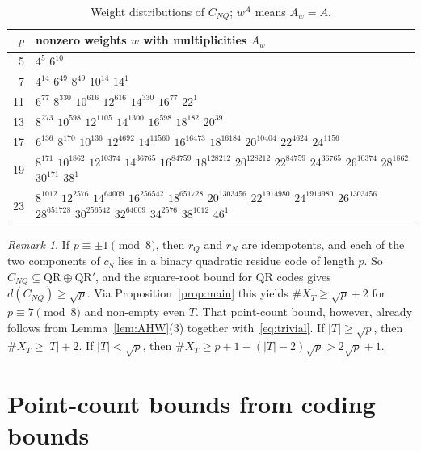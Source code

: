 \documentclass[12pt,letterpaper]{article}
\theoremstyle{definition}
\theoremstyle{remark}
\newtheorem{remark}[theorem]{Remark}
\numberwithin{equation}{section}
\newcommand{\CNQ}{C_{NQ}}
\newcommand{\X}{\#X}
\begin{document}
\begin{table}[ht]
\centering\small
\begin{tabular}{@{}r>{\raggedright\arraybackslash}p{}@{}}
\toprule
$p$ & nonzero weights $w$ with multiplicities $A_w$\\
\midrule
5 & $4^{5}$ $6^{10}$\\
7 & $4^{14}$ $6^{49}$ $8^{49}$ $10^{14}$ $14^{1}$\\
11 & $6^{77}$ $8^{330}$ $10^{616}$ $12^{616}$ $14^{330}$ $16^{77}$ $22^{1}$\\
13 & $8^{273}$ $10^{598}$ $12^{1105}$ $14^{1300}$ $16^{598}$ $18^{182}$ $20^{39}$\\
17 & $6^{136}$ $8^{170}$ $10^{136}$ $12^{4692}$ $14^{11560}$ $16^{16473}$ $18^{16184}$ $20^{10404}$ $22^{4624}$ $24^{1156}$\\
19 & $8^{171}$ $10^{1862}$ $12^{10374}$ $14^{36765}$ $16^{84759}$ $18^{128212}$ $20^{128212}$ $22^{84759}$ $24^{36765}$ $26^{10374}$ $28^{1862}$ $30^{171}$ $38^{1}$\\
23 & $8^{1012}$ $12^{2576}$ $14^{64009}$ $16^{256542}$ $18^{651728}$ $20^{1303456}$ $22^{1914980}$ $24^{1914980}$ $26^{1303456}$ $28^{651728}$ $30^{256542}$ $32^{64009}$ $34^{2576}$ $38^{1012}$ $46^{1}$\\
\bottomrule
\end{tabular}
\caption{Weight distributions of $\CNQ$; $w^{A}$ means $A_w=A$.}
\label{tab:wd}
\end{table}

\begin{remark}\label{rem:sqrt}
If $p\equiv\pm1\pmod8$, then $r_Q$ and $r_N$ are idempotents, and each of the two
components of $c_S$ lies in a binary quadratic residue code of length $p$. So
$\CNQ\subseteq\mathrm{QR}\oplus\mathrm{QR}'$, and the square-root bound for QR codes
gives $d(\CNQ)\ge\sqrt p$. Via Proposition~\ref{prop:main} this yields
$\X_T\ge\sqrt p+2$ for $p\equiv7\pmod8$ and non-empty even $T$. That point-count
bound, however, already follows from Lemma~\ref{lem:AHW}(3) together
with~\eqref{eq:trivial}. If $|T|\ge\sqrt p$, then $\X_T\ge|T|+2$. If
$|T|<\sqrt p$, then $\X_T\ge p+1-(|T|-2)\sqrt p>2\sqrt p+1$.
\end{remark}

\section{Point-count bounds from coding bounds}
\label{sec:bounds}
\end{document}
